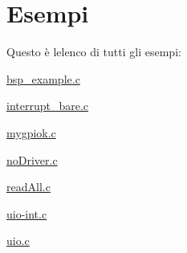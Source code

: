 \section{Esempi}
Questo è l\textquotesingle{}elenco di tutti gli esempi\+:\begin{DoxyCompactItemize}
\item 
\hyperlink{bsp_example_8c-example}{bsp\+\_\+example.\+c}
\item 
\hyperlink{interrupt_bare_8c-example}{interrupt\+\_\+bare.\+c}
\item 
\hyperlink{mygpiok_8c-example}{mygpiok.\+c}
\item 
\hyperlink{no_driver_8c-example}{no\+Driver.\+c}
\item 
\hyperlink{read_all_8c-example}{read\+All.\+c}
\item 
\hyperlink{uio-int_8c-example}{uio-\/int.\+c}
\item 
\hyperlink{uio_8c-example}{uio.\+c}
\end{DoxyCompactItemize}

